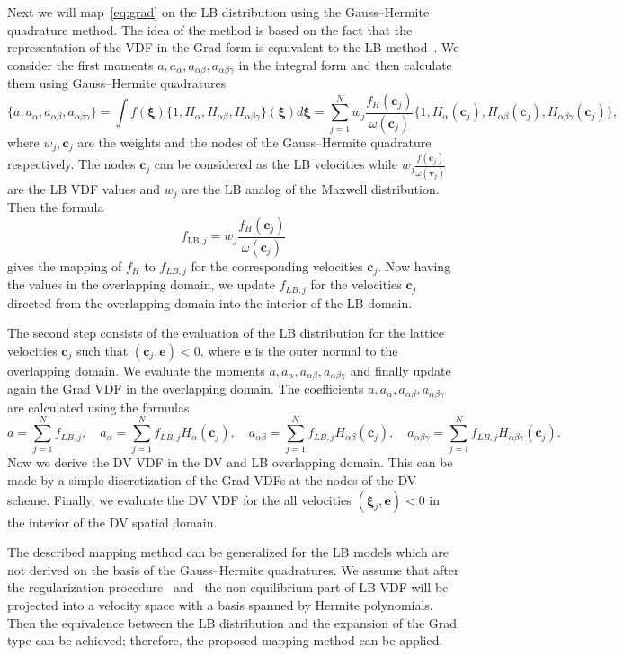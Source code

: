 \documentclass[]{elsarticle} %
\newcommand{\bxi}{\boldsymbol{\xi}}
\newcommand{\bv}{\boldsymbol{v}}
\newcommand{\bc}{\boldsymbol{c}}
\newcommand{\LB}{\mathrm{LB}}
\newcommand{\ai}{a_{\alpha}}
\newcommand{\aij}{a_{\alpha\beta}}
\newcommand{\aijk}{a_{\alpha\beta\gamma}}
\newcommand{\Hi}{H_{\alpha}}
\newcommand{\Hij}{H_{\alpha\beta}}
\newcommand{\Hijk}{H_{\alpha\beta\gamma}}
\begin{document}
Next we will map~\eqref{eq:grad} on the LB distribution using the Gauss--Hermite quadrature method.
The idea of the method is based on the fact that the representation of the VDF in the Grad form
is equivalent to the LB method~\cite{He1997, Shan1998, Shan2006}.
We consider the first moments $a,\ai,\aij, \aijk$ in the integral form and then calculate them using Gauss--Hermite quadratures
$$
    \{ a, \ai, \aij, \aijk \}=\int f(\bxi)\{ 1, \Hi, \Hij, \Hijk \}(\bxi)d\bxi =
    \sum_{j=1}^N w_j\frac{f_H(\bc_j)}{\omega(\bc_j)} \{ 1, \Hi(\bc_j), \Hij(\bc_j), \Hijk(\bc_j) \},
$$
where $w_j, \bc_j$ are the weights and the nodes of the Gauss--Hermite quadrature respectively.
The nodes $\bc_j$ can be considered as the LB velocities while $ w_j\frac{f(\bc_j)}{\omega(\bv_j)}$ are the LB VDF values and
$w_j$ are the LB analog of the Maxwell distribution.  Then the formula
\begin{equation}\label{eq:grad_to_latt}
f_{\LB,j}= w_j\frac{f_H(\bc_j)}{\omega(\bc_j)}
\end{equation}
gives the mapping of $f_H$ to $f_{LB,j}$ for the corresponding velocities $\bc_j$.
Now having the values in the overlapping domain, we update $f_{LB,j}$ for the velocities $\bc_j$
directed from the overlapping domain into the interior of the LB domain.


The second step consists of the evaluation of the LB   distribution for the lattice velocities $\bc_j$ such that $(\bc_j,\mathbf{e})<0$, where $\mathbf{e}$ is the outer normal to the overlapping domain.
We evaluate the moments $a,\ai,\aij,
\aijk$ and finally update again the Grad VDF in the overlapping domain.
The coefficients $a,\ai,\aij, \aijk$ are calculated using the formulas
$$
a=\sum_{j=1}^N f_{LB,j}, \quad \ai=\sum_{j=1}^N f_{LB,j}\Hi(\bc_j), \quad \aij=\sum_{j=1}^N f_{LB,j}\Hij(\bc_j),
\quad \aijk=\sum_{j=1}^N f_{LB,j}\Hijk(\bc_j).
$$
Now we  derive the DV VDF in the DV and LB overlapping domain. This can be made by a simple
discretization of the Grad VDFs at the nodes of the DV scheme.
Finally, we evaluate the DV VDF for the all velocities $(\bxi_j,\mathbf{e}) <0$
in the interior of the DV spatial domain.

The described mapping method can be generalized for the LB models which are not derived on the basis of the Gauss--Hermite quadratures.
We assume that after the regularization procedure~\cite{Latt2006, Chen2006} and~\cite{Zhang2006, Mont2015, Mattila2017}
the non-equilibrium part of LB VDF will be projected into a velocity space with a basis spanned by Hermite polynomials.
Then the equivalence between the LB distribution and the expansion of the Grad type can be achieved;
therefore, the proposed mapping method can be applied.
\end{document}
